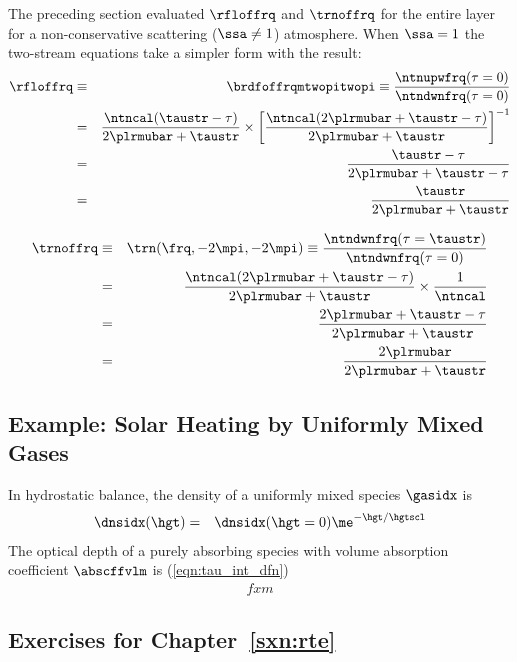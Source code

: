 \documentclass[12pt]{article}
\begin{document}
The preceding section evaluated $\rfloffrq$ and $\trnoffrq$ for the
entire layer for a non-conservative scattering ($\ssa \ne 1$)
atmosphere. 
When $\ssa = 1$ the two-stream equations take a simpler form with the
result:
\begin{eqnarray}
\rfloffrq & \equiv & \brdfoffrqmtwopitwopi \equiv 
\frac{\ntnupwfrq(\tau = 0)}{\ntndwnfrq(\tau = 0)} \nonumber \\
& = &
\frac{\ntncal(\taustr - \tau)}{2\plrmubar + \taustr}
\times
\left[ \frac{\ntncal(2\plrmubar + \taustr - \tau)}{2\plrmubar + \taustr}
\right]^{-1} \nonumber \\
& = &
\frac{\taustr - \tau}{2\plrmubar + \taustr - \tau} \\
& = &
\frac{\taustr}{2\plrmubar + \taustr} \nonumber
\label{eqn:flx_rfl_two_srm_csl}
\end{eqnarray}

\begin{eqnarray}
\trnoffrq & \equiv & \trn(\frq,-2\mpi,-2\mpi) \equiv
\frac{\ntndwnfrq(\tau = \taustr)}{\ntndwnfrq(\tau = 0)} \nonumber \\
& = &
\frac{\ntncal (2\plrmubar + \taustr - \tau)}{2\plrmubar + \taustr}
\times \frac{1}{\ntncal} \nonumber \\
& = &
\frac{2\plrmubar + \taustr - \tau}{2\plrmubar + \taustr} \\
& = &
\frac{2\plrmubar}{2\plrmubar + \taustr} \nonumber
\label{eqn:flx_trn_two_srm_csl}
\end{eqnarray}

\clearpage
\subsection[Solar Heating]{Example: Solar Heating by Uniformly Mixed Gases}\label{sxn:slr_htg}
In hydrostatic balance, the density of a uniformly mixed species
$\gasidx$ is
\begin{eqnarray}
\dnsidx(\hgt) & = & \dnsidx(\hgt = 0) \me^{-\hgt/\hgtscl} \\
\label{eqn:dns_hgt}
\end{eqnarray}
The optical depth of a purely absorbing species with volume
absorption coefficient $\abscffvlm$ is (\ref{eqn:tau_int_dfn})  
\begin{eqnarray}
fxm
\label{eqn:dns_hgt}
\end{eqnarray}


\subsection[Chapter Exercises]{Exercises for Chapter~\ref{sxn:rte}}\label{sxn:xrsz_rte}
\end{document}
